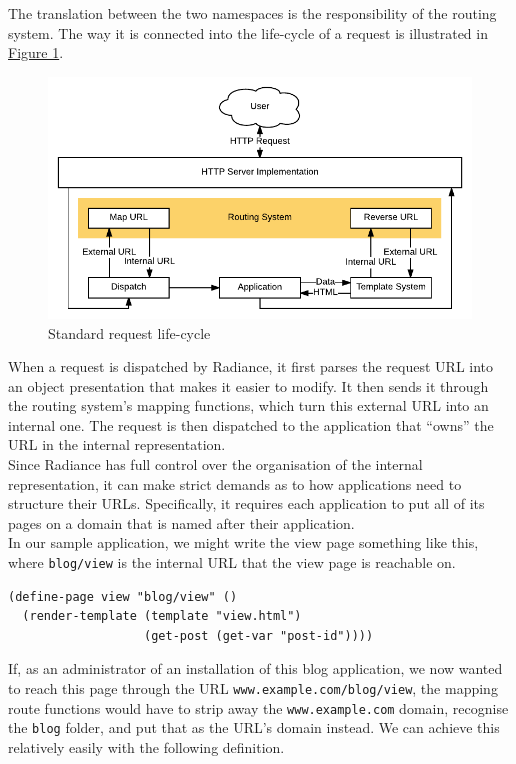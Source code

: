 \documentclass{sig-alternate}
\begin{document}
The translation between the two namespaces is the responsibility of the routing system. The way it is connected into the life-cycle of a request is illustrated in \hyperref[requestcycle]{Figure 1}. \\

\begin{figure}[h]
  \includegraphics[width=\columnwidth]{request}
  \caption{Standard request life-cycle}
  \label{requestcycle}
\end{figure}

When a request is dispatched by Radiance, it first parses the request URL into an object presentation that makes it easier to modify. It then sends it through the routing system's mapping functions, which turn this external URL into an internal one. The request is then dispatched to the application that ``owns'' the URL in the internal representation. \\

Since Radiance has full control over the organisation of the internal representation, it can make strict demands as to how applications need to structure their URLs. Specifically, it requires each application to put all of its pages on a domain that is named after their application. \\

In our sample application, we might write the view page something like this, where \texttt{blog/view} is the internal URL that the view page is reachable on.

\begin{verbatim}
(define-page view "blog/view" ()
  (render-template (template "view.html")
                   (get-post (get-var "post-id"))))
\end{verbatim}

If, as an administrator of an installation of this blog application, we now wanted to reach this page through the URL \texttt{www.example.com/blog/view}, the mapping route functions would have to strip away the \texttt{www.example.com} domain, recognise the \texttt{blog} folder, and put that as the URL's domain instead. We can achieve this relatively easily with the following definition.
\end{document}
